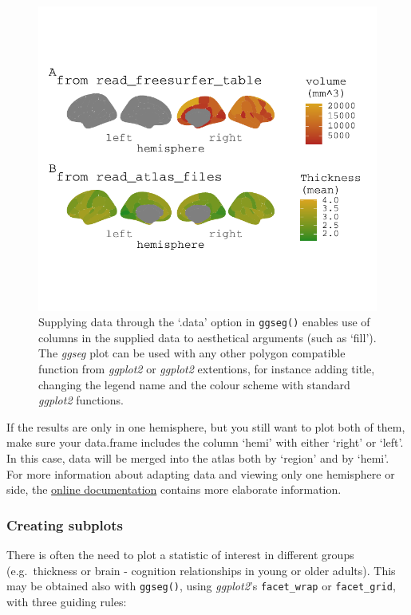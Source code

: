 \documentclass[fleqn,10pt]{wlpeerj} %
\begin{document}
\begin{figure}
\centering
\includegraphics{msc_ggseg_files/figure-latex/figure4-1.pdf}
\caption{\label{fig:figure4}Supplying data through the `.data' option in \texttt{ggseg()} enables use of columns in the supplied data to aesthetical arguments (such as `fill'). The \emph{ggseg} plot can be used with any other polygon compatible function from \emph{ggplot2} or \emph{ggplot2} extentions, for instance adding title, changing the legend name and the colour scheme with standard \emph{ggplot2} functions.}
\end{figure}

If the results are only in one hemisphere, but you still want to plot both of them, make sure your data.frame includes the column `hemi' with either `right' or `left'.
In this case, data will be merged into the atlas both by `region' and by `hemi'.
For more information about adapting data and viewing only one hemisphere or side, the \href{https://lcbc-uio.github.io/ggseg/articles/ggseg.html\#single-hemisphere-results}{online documentation} contains more elaborate information.

\hypertarget{creating-subplots}{%
\subsubsection{Creating subplots}\label{creating-subplots}}

There is often the need to plot a statistic of interest in different groups (e.g.~thickness or brain - cognition relationships in young or older adults).
This may be obtained also with \texttt{ggseg()}, using \emph{ggplot2}'s \texttt{facet\_wrap} or \texttt{facet\_grid}, with three guiding rules:
\end{document}
